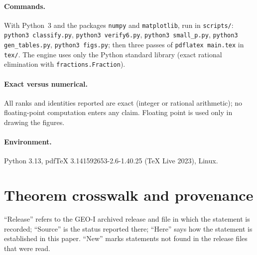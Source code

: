 \paragraph{Commands.} With Python~3 and the packages \texttt{numpy} and \texttt{matplotlib}, run in \texttt{scripts/}: \texttt{python3 classify.py}, \texttt{python3 verify6.py}, \texttt{python3 small\_p.py}, \texttt{python3 gen\_tables.py}, \texttt{python3 figs.py}; then three passes of \texttt{pdflatex main.tex} in \texttt{tex/}. The engine uses only the Python standard library (exact rational elimination with \texttt{fractions.Fraction}).

\paragraph{Exact versus numerical.} All ranks and identities reported are exact (integer or rational arithmetic); no floating-point computation enters any claim. Floating point is used only in drawing the figures.

\paragraph{Environment.} Python 3.13, pdfTeX 3.141592653-2.6-1.40.25 (TeX Live 2023), Linux.

\section{Theorem crosswalk and provenance}\label{app:crosswalk}

``Release'' refers to the GEO-I archived release and file in which the statement is recorded; ``Source'' is the status reported there; ``Here'' says how the statement is established in this paper. ``New'' marks statements not found in the release files that were read.


